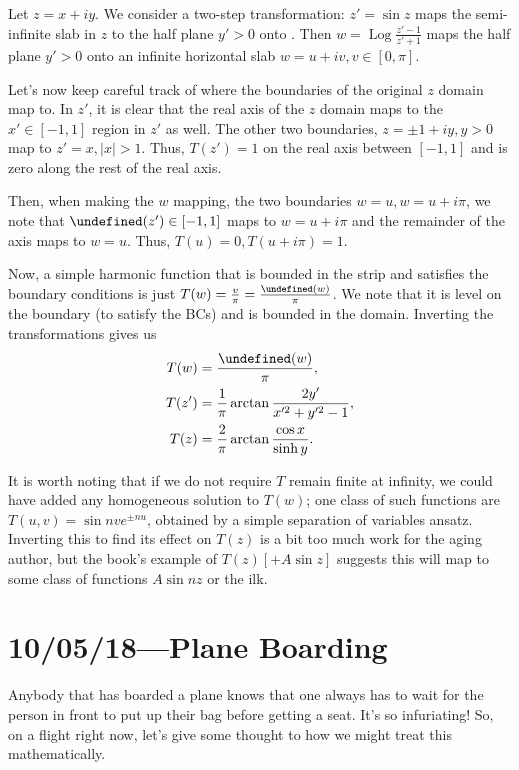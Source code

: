 \documentclass[12pt]{report}
\newcommand*{\abs}[1]{\left|#1\right|}
\let\Re\undefined
\let\Im\undefined
\DeclareMathOperator{\Re}{Re}
\DeclareMathOperator{\Im}{Im}
\DeclareMathOperator{\Log}{Log}
\begin{document}
Let $z = x + iy$. We consider a two-step transformation: $z' = \sin z$ maps the
semi-infinite slab in $z$ to the half plane $y' > 0$ onto . Then $w = \Log
\frac{z' - 1}{z' + 1}$ maps the half plane $y' > 0$ onto an infinite horizontal
slab $w = u + iv, v \in [0, \pi]$.

Let's now keep careful track of where the boundaries of the original $z$ domain
map to. In $z'$, it is clear that the real axis of the $z$ domain maps to the
$x' \in [-1, 1]$ region in $z'$ as well. The other two boundaries, $z = \pm 1 +
iy, y > 0$ map to $z' = x, \abs{x} > 1$. Thus, $T(z') = 1$ on the real axis
between $[-1, 1]$ and is zero along the rest of the real axis.

Then, when making the $w$ mapping, the two boundaries $w = u, w = u + i\pi$, we
note that $\Re(z') \in [-1, 1]$ maps to $w = u + i\pi$ and the remainder of the
axis maps to $w = u$. Thus, $T(u) = 0, T(u + i\pi) = 1$.

Now, a simple harmonic function that is bounded in the strip and satisfies the
boundary conditions is just $T(w) = \frac{v}{\pi} = \frac{\Im(w)}{\pi}$. We note
that it is level on the boundary (to satisfy the BCs) and is bounded in the
domain. Inverting the transformations gives us
\begin{align}
    T(w) &= \frac{\Im(w)}{\pi},\\
    T(z') &= \frac{1}{\pi}\arctan \frac{2y'}{x'^2 + y'^2 - 1},\\
    T(z) &= \frac{2}{\pi} \arctan \frac{\cos x}{\sinh y}.
\end{align}

It is worth noting that if we do not require $T$ remain finite at infinity, we
could have added any homogeneous solution to $T(w)$; one class of such functions
are $T(u, v) = \sin nv e^{\pm nu}$, obtained by a simple separation of variables
ansatz. Inverting this to find its effect on $T(z)$ is a bit too much work for
the aging author, but the book's example of $T(z) [ + A\sin z]$ suggests this
will map to some class of functions $A \sin nz$ or the ilk.

\chapter{10/05/18---Plane Boarding}

Anybody that has boarded a plane knows that one always has to wait for the
person in front to put up their bag before getting a seat. It's so infuriating!
So, on a flight right now, let's give some thought to how we might treat this
mathematically.
\end{document}
